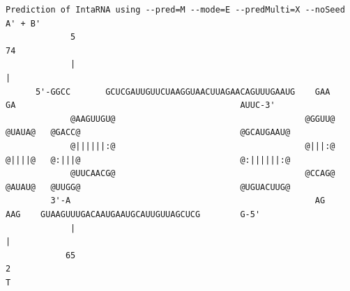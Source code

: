 \documentclass[11pt,a4paper]{report}
\begin{document}
\begin{landscape}
\begin{lstlisting}[style=base]
Prediction of IntaRNA using --pred=M --mode=E --predMulti=X --noSeed
A' + B'
             5                                                                                                     74
             |                                                                                                     |
      5'-GGCC       GCUCGAUUGUUCUAAGGUAACUUAGAACAGUUUGAAUG    GAA    GA                                             AUUC-3'
             @AAGUUGU@                                      @GGUU@   @UAUA@   @GACC@                                @GCAUGAAU@
             @||||||:@                                      @|||:@   @||||@   @:|||@                                @:||||||:@
             @UUCAACG@                                      @CCAG@   @AUAU@   @UUGG@                                @UGUACUUG@
         3'-A                                                 AG     AAG    GUAAGUUUGACAAUGAAUGCAUUGUUAGCUCG        G-5'
             |                                                                                                     |
            65                                                                                                     2
T
\end{lstlisting}
\label{Result:cross}
\end{landscape}
\newpage
\end{document}
